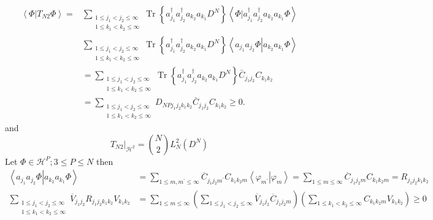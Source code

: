 \documentclass[aps,preprint]{revtex4}%
\begin{document}
\begin{align}
\left\langle \left.  \Phi\right\vert T_{N2}\Phi\right\rangle =  &
\sum_{\substack{1\leq j_{1}<j_{2}\leq\infty\\1\leq k_{1}<k_{2}\leq\infty
}}\operatorname{Tr}\left\{  a_{j_{1}}^{\dagger}a_{j_{2}}^{\dagger}a_{k_{2}%
}a_{k_{1}}D^{N}\right\}  \left\langle \left.  \Phi\right\vert a_{j_{1}%
}^{\dagger}a_{j_{2}}^{\dagger}a_{k_{2}}a_{k_{1}}\Phi\right\rangle \\
&  \sum_{\substack{1\leq j_{1}<j_{2}\leq\infty\\1\leq k_{1}<k_{2}\leq\infty
}}\operatorname{Tr}\left\{  a_{j_{1}}^{\dagger}a_{j_{2}}^{\dagger}a_{k_{2}%
}a_{k_{1}}D^{N}\right\}  \left\langle \left.  a_{j_{1}}a_{j_{2}}%
\Phi\right\vert a_{k_{2}}a_{k_{1}}\Phi\right\rangle \\
&  =\sum_{\substack{1\leq j_{1}<j_{2}\leq\infty\\1\leq k_{1}<k_{2}\leq\infty
}}\operatorname{Tr}\left\{  a_{j_{1}}^{\dagger}a_{j_{2}}^{\dagger}a_{k_{2}%
}a_{k_{1}}D^{N}\right\}  \bar{C}_{j_{1}j_{2}}C_{k_{1}k_{2}}\\
&  =\sum_{\substack{1\leq j_{1}<j_{2}\leq\infty\\1\leq k_{1}<k_{2}\leq\infty
}}D_{NPj_{1}j_{2}k_{1}k_{2}}\bar{C}_{j_{1}j_{2}}C_{k_{1}k_{2}}\geq0.
\end{align}
and
\begin{equation}
\left.  T_{N2}\right\vert _{\mathcal{H}^{2}}=\binom{N}{2}L_{N}^{2}\left(
D^{N}\right)
\end{equation}
Let $\Phi\in\mathcal{H}^{P};3\leq P\leq N$ then%
\begin{align}
\left\langle \left.  a_{j_{1}}a_{j_{2}}\Phi\right\vert a_{k_{2}}a_{k_{1}}%
\Phi\right\rangle  &  =\sum_{1\leq m,m^{\prime}\leq\infty}\overline{C}%
_{j_{1}j_{2}m^{\prime}}C_{k_{1}k_{2}m}\left\langle \left.  \varphi_{m^{\prime
}}\right\vert \varphi_{m}\right\rangle =\sum_{1\leq m\leq\infty}\overline
{C}_{j_{1}j_{2}m}C_{k_{1}k_{2}m}=R_{j_{1}j_{2}k_{1}k_{2}}\\
\sum_{\substack{1\leq j_{1}<j_{2}\leq\infty\\1\leq k_{1}<k_{2}\leq\infty
}}\overline{V}_{j_{1}j_{2}}R_{j_{1}j_{2}k_{1}k_{2}}V_{k_{1}k_{2}}  &
=\sum_{1\leq m\leq\infty}\left(  \sum_{1\leq j_{1}<j_{2}\leq\infty}%
\overline{V}_{j_{1}j_{2}}\overline{C}_{j_{1}j_{2}m}\right)  \left(
\sum_{1\leq k_{1}<k_{2}\leq\infty}C_{k_{1}k_{2}m}V_{k_{1}k_{2}}\right)  \geq0
\end{align}%
\end{document}
